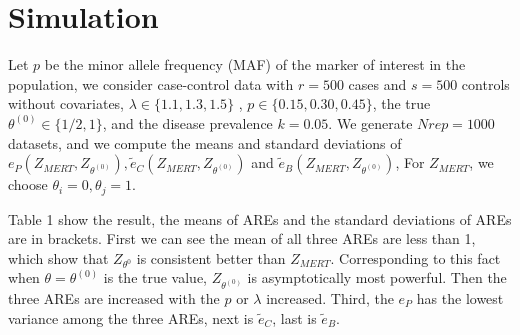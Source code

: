 \documentclass[12pt]{article} %
\begin{document}


\section{Simulation} %
Let $p$ be the minor allele frequency (MAF) of the marker of interest in the population, we consider case-control data with $r=500$ cases and $s= 500$ controls without covariates, $\lambda \in \{1.1, 1.3, 1.5\}$ , $p \in \{0.15,0.30, 0.45 \}$,  the true $\theta^{(0)} \in \{1/2,1\}$,  and the disease prevalence $k=0.05$. We generate $Nrep=1000$ datasets, and we compute the means and standard deviations of  $e_P(Z_{MERT},Z_{\theta^{(0)}}), \tilde{e}_C(Z_{MERT},Z_{\theta^{(0)}})$ and $\tilde{e}_B(Z_{MERT},Z_{\theta^{(0)}})$, For $Z_{MERT}$, we choose $\theta_i=0, \theta_j=1$. 

Table 1 show the result, the means of AREs and the standard deviations of AREs are in brackets.  First we can see the mean of all three AREs are less than 1, which show that $Z_{\theta^{{0}}}$ is consistent better than $Z_{MERT}$. Corresponding to this fact when $\theta= \theta^{(0)}$ is the true value, $Z_{\theta^{(0)}}$ is asymptotically most powerful. Then the three AREs are increased with the $p$ or $\lambda$ increased. Third, the $e_P$ has the lowest variance among the three AREs, next is $\tilde{e}_C$, last is $\tilde{e}_B$.
\end{document}

